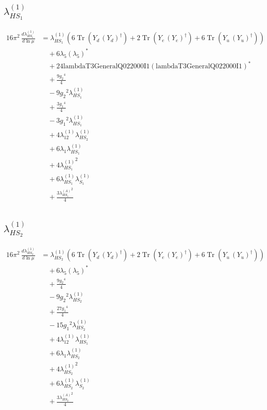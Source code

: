 \documentclass[10pt,a4paper]{article}
\begin{document}
\subsection*{$\lambda_{HS_1}^{(1)}$}
\begin{align*}
16\pi^2\,\frac{d \lambda_{HS_1}^{(1)}}{d\ln\mu} &={\lambda_{HS_1}^{(1)}} (6 \operatorname{Tr}\!\left({Y_d}\,\left({Y_d}\right)^{\dagger}\right)+2 \operatorname{Tr}\!\left({Y_e}\,\left({Y_e}\right)^{\dagger}\right)+6 \operatorname{Tr}\!\left({Y_u}\,\left({Y_u}\right)^{\dagger}\right)) \\
&\quad +6 {\lambda_5} \left({\lambda_5}\right)^{*} \\
&\quad +24 \text{lambdaT3GeneralQ022000I1} \left(\text{lambdaT3GeneralQ022000I1}\right)^{*} \\
&\quad +\frac{9 {g_2}^4}{4} \\
&\quad -9 {g_2}^2 {\lambda_{HS_1}^{(1)}} \\
&\quad +\frac{3 {g_1}^4}{4} \\
&\quad -3 {g_1}^2 {\lambda_{HS_1}^{(1)}} \\
&\quad +4 {\lambda_{12}^{(1)}} {\lambda_{HS_2}^{(1)}} \\
&\quad +6 {\lambda_1} {\lambda_{HS_1}^{(1)}} \\
&\quad +4 {\lambda_{HS_1}^{(1)}}^2 \\
&\quad +6 {\lambda_{HS_1}^{(1)}} {\lambda_{S_1}^{(1)}} \\
&\quad +\frac{3 {\lambda_{HS_1}^{(A)}}^2}{4} \\
\end{align*}
\subsection*{$\lambda_{HS_2}^{(1)}$}
\begin{align*}
16\pi^2\,\frac{d \lambda_{HS_2}^{(1)}}{d\ln\mu} &={\lambda_{HS_2}^{(1)}} (6 \operatorname{Tr}\!\left({Y_d}\,\left({Y_d}\right)^{\dagger}\right)+2 \operatorname{Tr}\!\left({Y_e}\,\left({Y_e}\right)^{\dagger}\right)+6 \operatorname{Tr}\!\left({Y_u}\,\left({Y_u}\right)^{\dagger}\right)) \\
&\quad +6 {\lambda_5} \left({\lambda_5}\right)^{*} \\
&\quad +\frac{9 {g_2}^4}{4} \\
&\quad -9 {g_2}^2 {\lambda_{HS_2}^{(1)}} \\
&\quad +\frac{27 {g_1}^4}{4} \\
&\quad -15 {g_1}^2 {\lambda_{HS_2}^{(1)}} \\
&\quad +4 {\lambda_{12}^{(1)}} {\lambda_{HS_1}^{(1)}} \\
&\quad +6 {\lambda_1} {\lambda_{HS_2}^{(1)}} \\
&\quad +4 {\lambda_{HS_2}^{(1)}}^2 \\
&\quad +6 {\lambda_{HS_2}^{(1)}} {\lambda_{S_2}^{(1)}} \\
&\quad +\frac{3 {\lambda_{HS_2}^{(A)}}^2}{4} \\
\end{align*}
\end{document}
